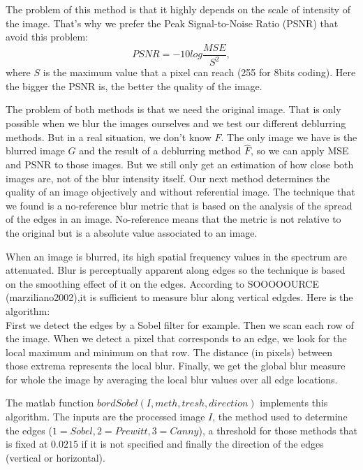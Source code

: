 The problem of this method is that it highly depends on the scale of intensity of the image. That's why we prefer the Peak Signal-to-Noise Ratio (PSNR) that avoid this problem:
\begin{equation}
PSNR = -10 log \frac{MSE}{S^2},
\end{equation}
where $S$ is the maximum value that a pixel can reach (255 for 8bits coding). Here the bigger the PSNR is, the better the quality of the image.

The problem of both methods is that we need the original image. That is only possible when we blur the images ourselves and we test our different deblurring methods. But in a real situation, we don't know $F$. The only image we have is the blurred image $G$ and the result of a deblurring method $\hat{F}$, so we can apply MSE and PSNR to those images. But we still only get an estimation of how close both images are, not of the blur intensity itself. Our next method determines the quality of an image objectively and without referential image. The technique that we found is a no-reference blur metric that is based on the analysis of the spread of the edges in an image. No-reference means that the metric is not relative to the original but is a absolute value associated to an image.

When an image is blurred, its high spatial frequency values in the spectrum are attenuated. Blur is perceptually apparent along edges so the technique is based on the smoothing effect of it on the edges. According to SOOOOOURCE (marziliano2002),it is sufficient to measure blur along vertical edgdes. Here is the algorithm:\\
First we detect the edges by a Sobel filter for example. Then we scan each row of the image. When we detect a pixel that corresponds to an edge, we look for the local maximum and minimum on that row. The distance (in pixels) between those extrema represents the local blur. Finally, we get the global blur measure for whole the image by averaging the local blur values over all edge locations.

The matlab function $bordSobel(I,meth,tresh,direction)$ implements this algorithm. The inputs are the processed image $I$, the method used to determine the edges ($1=Sobel, 2=Prewitt, 3=Canny$), a threshold for those methods that is fixed at $0.0215$ if it is not specified and finally the direction of the edges (vertical or horizontal).



